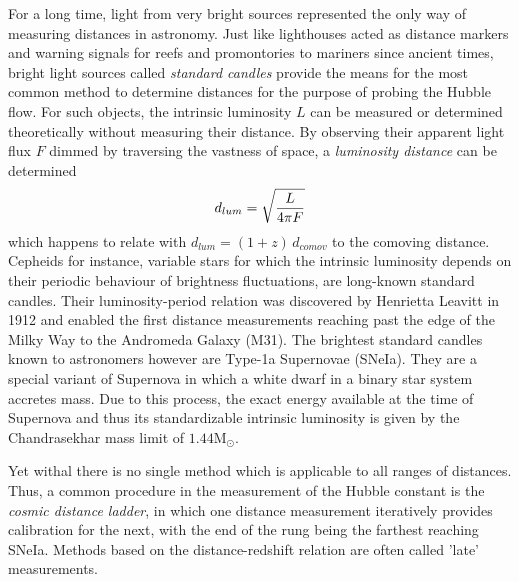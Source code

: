 For a long time, light from very bright sources represented the only way of
measuring distances in astronomy.  Just like lighthouses acted as
distance markers and warning signals for reefs and promontories to mariners
since ancient times, bright light sources called \textit{standard candles}
provide the means for the most common method to determine distances for the
purpose of probing the Hubble flow.  For such objects, the intrinsic luminosity
$L$ can be measured or determined theoretically without measuring their
distance.  By observing their apparent light flux $F$ dimmed by traversing the
vastness of space, a \textit{luminosity distance} can be determined
%
\begin{equation}\eqlbl{d_lum}%
    d_{lum} = \sqrt{\frac{L}{4\pi F}}
\end{equation}%
%
which happens to relate with $d_{lum}={(1+z)\,d_{comov}}$ to the comoving
distance.  Cepheids for instance, variable stars for which the intrinsic
luminosity depends on their periodic behaviour of brightness fluctuations, are
long-known standard candles.  Their luminosity-period relation was discovered by
Henrietta Leavitt in 1912 and enabled the first distance measurements reaching
past the edge of the Milky Way to the Andromeda Galaxy (M31).  The brightest
standard candles known to astronomers however are Type-1a Supernovae (SNeIa).
They are a special variant of Supernova in which a white dwarf in a binary star
system accretes mass.  Due to this process, the exact energy available at the
time of Supernova and thus its standardizable intrinsic luminosity is given by
the Chandrasekhar mass limit of $1.44\mathrm{M_\odot}$.  

Yet withal there is no single method which is applicable to all ranges of
distances.  Thus, a common procedure in the measurement of the Hubble constant
is the \textit{cosmic distance ladder}, in which one distance measurement
iteratively provides calibration for the next, with the end of the rung being
the farthest reaching SNeIa.  Methods based on the distance-redshift relation
are often called 'late' measurements.

